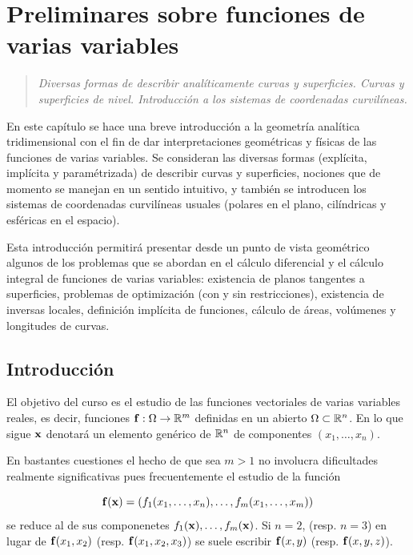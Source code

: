 \chapter{Preliminares sobre funciones de varias variables}
\begin{quote}
    {\it Diversas formas de describir analíticamente curvas y superficies. Curvas y superficies de nivel. Introducción a los sistemas de coordenadas curvilíneas.}
\end{quote}

En este capítulo se hace una breve introducción a la geometría analítica tridimensional con el fin de dar interpretaciones geométricas y físicas de las funciones de varias variables. Se consideran las diversas formas (explícita, implícita y paramétrizada) de describir curvas y superficies, nociones que de momento se manejan en un sentido intuitivo, y también se introducen los sistemas de coordenadas curvilíneas usuales (polares en el plano, cilíndricas y esféricas en el espacio).

Esta introducción permitirá presentar desde un punto de vista geométrico algunos de los problemas que se abordan en el cálculo diferencial y el cálculo integral de funciones de varias variables: existencia de planos tangentes a superficies, problemas de optimización (con y sin restricciones), existencia de inversas locales, definición implícita de funciones, cálculo de áreas, volúmenes y longitudes de curvas.

\section{Introducción}

El objetivo del curso es el estudio de las funciones vectoriales de varias variables reales, es decir, funciones $\mathbf{f}:\Omega\rightarrow\mathbb{R}^m$ definidas en un abierto $\Omega\subset\mathbb{R}^n$. En lo que sigue $\mathbf{x}$ denotará un elemento genérico de $\mathbb{R}^n$ de componentes $(x_1,\dots,x_n)$.

En bastantes cuestiones el hecho de que sea $m>1$ no involucra dificultades realmente significativas pues frecuentemente el estudio de la función

$$\mathbf{f}(\mathbf{x})=\left(f_1(x_1,\dots,x_n),\dots,f_m(x_1,\dots,x_m)\right)$$
se reduce al de sus componenetes $f_1(\mathbf{x}),\dots,f_m(\mathbf{x})$. Si $n=2$, (resp. $n=3$) en lugar de $\mathbf{f}(x_1,x_2)$ (resp. $\mathbf{f}(x_1,x_2,x_3)$) se suele escribir $\mathbf{f}(x,y)$ (resp. $\mathbf{f}(x,y,z)$).

